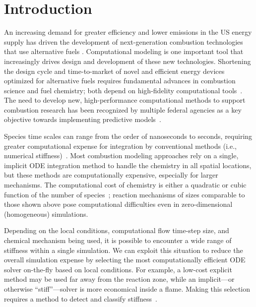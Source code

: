 \documentclass[12pt]{ussci}
\begin{document}
\section{Introduction}
%

An increasing demand for greater efficiency and lower  emissions in the US energy supply has driven the development of next-generation combustion technologies that use alternative fuels \cite{Epstein2012}.
Computational modeling is one important tool that increasingly drives design and development of these new technologies.
Shortening the design cycle and time-to-market of novel and efficient energy devices optimized for alternative fuels requires fundamental advances in combustion science and fuel chemistry; both depend on high-fidelity computational tools~\cite{Niemeyer}.
The need to develop new, high-performance computational methods to support combustion research has been recognized by multiple federal agencies as a key objective towards implementing predictive models~\cite{Trouve:2006tq,DOE:2007tj,NationalResearchCouncil:2011ub,National-Research-Council:2014aa}.

Species time scales can range from the order of nanoseconds to seconds, requiring greater computational expense for integration by conventional methods (i.e., numerical stiffness)~\cite{Lu2009}.
Most combustion modeling approaches rely on a single, implicit ODE integration method to handle the chemistry in all spatial locations, but these methods are computationally expensive, especially for larger mechanisms.
The computational cost of chemistry is either a quadratic or cubic function of the number of species~\cite{Lu2009}; reaction mechanisms of sizes comparable to those shown above pose computational difficulties even in zero-dimensional (homogeneous) simulations.

Depending on the local conditions, computational flow time-step size, and chemical mechanism being used, it is possible to encounter a wide range of stiffness within a single simulation.
We can exploit this situation to reduce the overall simulation expense by selecting the most computationally efficient ODE solver on-the-fly based on local conditions.
For example, a low-cost explicit method may be used far away from the reaction zone, while an implicit---or otherwise ``stiff''---solver is more economical inside a flame.
Making this selection requires a method to detect and classify stiffness~\cite{Niemeyer}.
\end{document}
